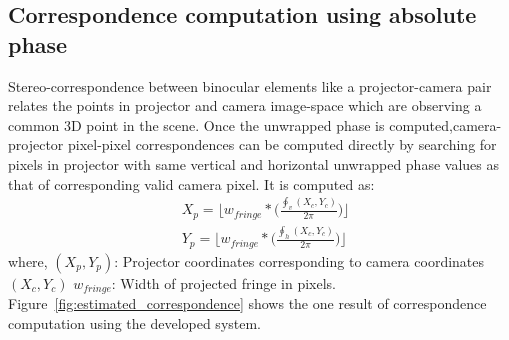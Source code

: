 \subsection{Correspondence computation using absolute phase}
Stereo-correspondence between binocular elements like a projector-camera pair relates the points in projector and camera image-space which are observing a common 3D point in the scene.\newline%
\indent Once the unwrapped phase is computed,camera-projector pixel-pixel correspondences can be computed directly by searching for pixels in projector with same vertical and horizontal unwrapped phase values as that of corresponding valid camera pixel. It is computed as:
\begin{equation}
\begin{aligned}
& X_p=\lfloor w_{fringe}*\big(\frac{\oint_v(X_c,Y_c)}{2\pi}\big) \rfloor \\ 
& Y_p=\lfloor w_{fringe}*\big(\frac{\oint_h(X_c,Y_c)}{2\pi}\big) \rfloor
\end{aligned}
\end{equation}
\noindent
where,\newline
$(X_p,Y_p)$: Projector coordinates corresponding to camera coordinates $(X_c,Y_c)$\newline
$w_{fringe}$: Width of projected fringe in pixels.\newline
Figure~\ref{fig:estimated_correspondence} shows the one result of correspondence computation using the developed system.
